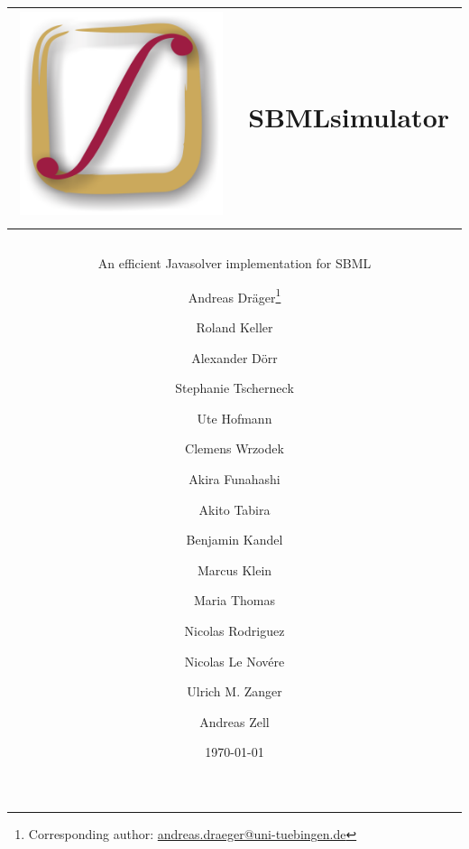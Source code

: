 \documentclass[
  BCOR12mm,
  letterpaper,
  11pt,
  headsepline,
  pointlessnumbers,
  tablecaptionabove,
  onelinecaption,
  headinclude,
  appendixprefix,
  idxtotoc,
  bibtotoc,
  twoside,
  titlepage
]{scrreprt}
\title{
\centering
\begin{tabular}{rl}
\includegraphics[width=.2\columnwidth]{../logo/Logo.pdf} &
SBMLsimulator
\end{tabular}
}
\subtitle{An efficient Java\TTra solver implementation for SBML}
\author{Andreas Dr\"ager\thanks{Corresponding author:
\href{mailto:andreas.draeger@uni-tuebingen.de}{andreas.draeger@uni-tuebingen.de}}\and%
Roland Keller\and%
Alexander D\"orr\and%
Stephanie Tscherneck\and%
Ute Hofmann\and%
Clemens Wrzodek\and%
Akira Funahashi\and%
Akito Tabira\and%
Benjamin Kandel\and%
Marcus Klein\and%
Maria Thomas\and%
Nicolas Rodriguez\and%
Nicolas Le Nov\'ere\and%
Ulrich M. Zanger\and%
Andreas Zell}
\date{\today}
\begin{document}

\maketitle
\begin{abstract}

\end{abstract}

\setcounter{tocdepth}{1}
\tableofcontents		%

\cleardoublepage		%











\end{document}
